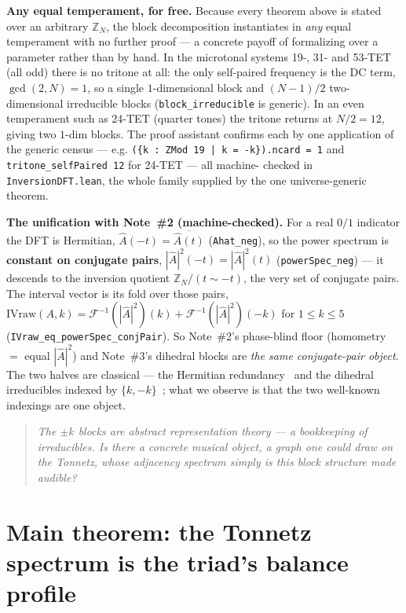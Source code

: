 \documentclass[11pt]{article}
\newcommand{\lean}[1]{\texttt{#1}}
\newcommand{\qlink}[1]{\par\medskip\begin{quote}\itshape\small\color{ctB!88!black}#1\end{quote}\medskip}
\newcommand{\Zn}[1]{\mathbb{Z}_{#1}}
\newcommand{\dft}{\mathcal{F}}
\newcommand{\Ahat}{\hat{A}}
\begin{document}
\textbf{Any equal temperament, for free.} Because every theorem above is stated over an arbitrary $\Zn{N}$,
the block decomposition instantiates in \emph{any} equal temperament with no further proof --- a concrete
payoff of formalizing over a parameter rather than by hand. In the microtonal systems 19-, 31- and 53-TET
(all odd) there is no tritone at all: the only self-paired frequency is the DC term, $\gcd(2,N)=1$, so a
single $1$-dimensional block and $(N-1)/2$ two-dimensional irreducible blocks (\lean{block\_irreducible} is
generic). In an even temperament such as 24-TET (quarter tones) the tritone returns at $N/2=12$, giving two
$1$-dim blocks. The proof assistant confirms each by one application of the generic census --- e.g.
\lean{(\{k : ZMod 19 | k = -k\}).ncard = 1} and \lean{tritone\_selfPaired 12} for 24-TET --- all machine-
checked in \lean{InversionDFT.lean}, the whole family supplied by the one universe-generic theorem.

\textbf{The unification with Note~\#2 (machine-checked).} For a real $0/1$ indicator the DFT is Hermitian,
$\Ahat(-t)=\overline{\Ahat(t)}$ (\lean{Ahat\_neg}), so the power spectrum is \textbf{constant on conjugate
pairs}, $|\Ahat|^2(-t)=|\Ahat|^2(t)$ (\lean{powerSpec\_neg}) --- it descends to the inversion quotient
$\Zn{N}/(t\sim-t)$, the very set of conjugate pairs. The interval vector is its fold over those pairs,
$\mathrm{IVraw}(A,k)=\dft^{-1}(|\Ahat|^2)(k)+\dft^{-1}(|\Ahat|^2)(-k)$ for $1\le k\le5$
(\lean{IVraw\_eq\_powerSpec\_conjPair}). So Note~\#2's phase-blind floor (homometry $=$ equal $|\Ahat|^2$) and
Note~\#3's dihedral blocks are \emph{the same conjugate-pair object}. The two halves are classical --- the
Hermitian redundancy~\cite{Amiot,MGAAA} and the dihedral irreducibles indexed by $\{k,-k\}$~\cite{CFS}; what
we observe is that the two well-known indexings are one object.

\qlink{The $\pm k$ blocks are abstract representation theory --- a bookkeeping of irreducibles. Is there a
\emph{concrete} musical object, a graph one could draw on the Tonnetz, whose adjacency spectrum simply
\emph{is} this block structure made audible?}

\section{Main theorem: the Tonnetz spectrum is the triad's balance profile}\label{sec:tonnetz}
\end{document}
